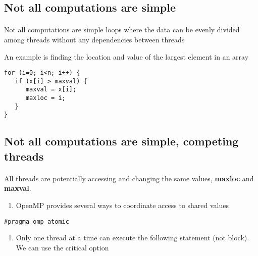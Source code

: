 \documentclass[%
oneside,                 %
final,                   %
10pt]{article}
\begin{document}
\subsection*{Not all computations are simple}

\paragraph{}
Not all computations are simple loops where the data can be evenly 
divided among threads without any dependencies between threads

An example is finding the location and value of the largest element in an array







\begin{verbatim}
for (i=0; i<n; i++) { 
   if (x[i] > maxval) {
      maxval = x[i];
      maxloc = i; 
   }
}

\end{verbatim}



\subsection*{Not all computations are simple, competing threads}

\paragraph{}
All threads are potentially accessing and changing the same values, \textbf{maxloc} and \textbf{maxval}.
\begin{enumerate}
\item OpenMP provides several ways to coordinate access to shared values
\end{enumerate}

\noindent


\begin{verbatim}
#pragma omp atomic

\end{verbatim}

\begin{enumerate}
\item Only one thread at a time can execute the following statement (not block). We can use the critical option
\end{enumerate}
\end{document}
